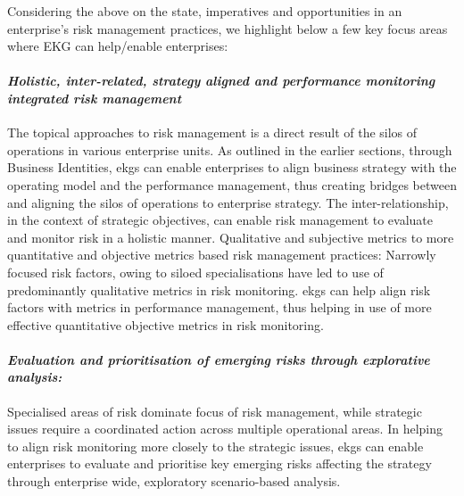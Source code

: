 %
%
Considering the above on the state, imperatives and opportunities in an enterprise’s risk management practices,
we highlight below a few key focus areas where EKG can help/enable enterprises:

\paragraph*{\textit{Holistic, inter-related, strategy aligned and performance monitoring integrated risk management}}

The topical approaches to risk management is a direct result of the silos of operations in various enterprise units.
As outlined in the earlier sections, through Business Identities,
\glspl{ekg} can enable enterprises to align business strategy with the operating model and the performance management,
thus creating bridges between and aligning the silos of operations to enterprise strategy.
The inter-relationship, in the context of strategic objectives,
can enable risk management to evaluate and monitor risk in a holistic manner.
Qualitative and subjective metrics to more quantitative and objective metrics based risk management practices:
Narrowly focused risk factors, owing to siloed specialisations have led to use of predominantly qualitative metrics
in risk monitoring.
\Glspl{ekg} can help align risk factors with metrics in performance management,
thus helping in use of more effective quantitative objective metrics in risk monitoring.

\paragraph*{\textit{Evaluation and prioritisation of emerging risks through explorative analysis:}}

Specialised areas of risk dominate focus of risk management, while strategic issues require a coordinated action
across multiple operational areas.
In helping to align risk monitoring more closely to the strategic issues,
\glspl{ekg} can enable enterprises to evaluate and prioritise key emerging risks affecting the strategy
through enterprise wide, exploratory scenario-based analysis.

